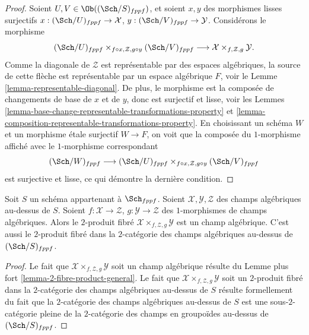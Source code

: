 \begin{proof}
\medskip\noindent
Soient $U, V \in \Ob((\Sch/S)_{fppf})$,
et soient $x, y$ des morphismes lisses surjectifs
$x : (\Sch/U)_{fppf} \to \mathcal{X}$,
$y : (\Sch/V)_{fppf} \to \mathcal{Y}$.
Considérons le morphisme
$$
(\Sch/U)_{fppf}
\times_{f \circ x, \mathcal{Z}, g \circ y}
(\Sch/V)_{fppf}
\longrightarrow
\mathcal{X} \times_{f, \mathcal{Z}, g} \mathcal{Y}.
$$
Comme la diagonale de $\mathcal{Z}$ est représentable par des espaces algébriques,
la source de cette flèche est représentable par un espace algébrique $F$, voir le
Lemme \ref{lemma-representable-diagonal}.
De plus, le morphisme est la composée
de changements de base de $x$ et de $y$, donc est surjectif et lisse, voir les
Lemmes \ref{lemma-base-change-representable-transformations-property} et
\ref{lemma-composition-representable-transformations-property}.
En choisissant un schéma $W$ et un morphisme \'etale surjectif $W \to F$,
on voit que la composée du $1$-morphisme affiché
avec le $1$-morphisme correspondant
$$
(\Sch/W)_{fppf}
\longrightarrow
(\Sch/U)_{fppf}
\times_{f \circ x, \mathcal{Z}, g \circ y}
(\Sch/V)_{fppf}
$$
est surjective et lisse, ce qui démontre la dernière condition.
\end{proof}

\begin{lemma}
\label{lemma-2-fibre-product}
Soit $S$ un schéma appartenant à $\Sch_{fppf}$.
Soient $\mathcal{X}, \mathcal{Y}, \mathcal{Z}$ des champs algébriques au-dessus de $S$.
Soient $f : \mathcal{X} \to \mathcal{Z}$, $g : \mathcal{Y} \to \mathcal{Z}$
des $1$-morphismes de champs algébriques. Alors le $2$-produit fibré
$\mathcal{X} \times_{f, \mathcal{Z}, g} \mathcal{Y}$ est un champ algébrique.
C'est aussi le $2$-produit fibré dans la $2$-catégorie des champs algébriques
au-dessus de $(\Sch/S)_{fppf}$.
\end{lemma}

\begin{proof}
Le fait que $\mathcal{X} \times_{f, \mathcal{Z}, g} \mathcal{Y}$ soit un
champ algébrique résulte du
Lemme plus fort \ref{lemma-2-fibre-product-general}.
Le fait que $\mathcal{X} \times_{f, \mathcal{Z}, g} \mathcal{Y}$
soit un $2$-produit fibré dans la $2$-catégorie des champs algébriques au-dessus de $S$
résulte formellement du fait que la $2$-catégorie des champs algébriques
au-dessus de $S$ est une sous-$2$-catégorie pleine de la $2$-catégorie des champs en
groupoïdes au-dessus de $(\Sch/S)_{fppf}$.
\end{proof}








